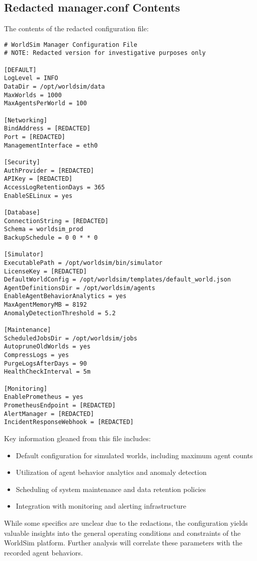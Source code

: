 \documentclass{article}
\begin{document}
\subsection{Redacted manager.conf Contents}
\label{apx:redactedconf}
The contents of the redacted configuration file:

\begin{verbatim}
# WorldSim Manager Configuration File
# NOTE: Redacted version for investigative purposes only

[DEFAULT]
LogLevel = INFO
DataDir = /opt/worldsim/data  
MaxWorlds = 1000
MaxAgentsPerWorld = 100

[Networking]  
BindAddress = [REDACTED]
Port = [REDACTED]
ManagementInterface = eth0

[Security]
AuthProvider = [REDACTED]  
APIKey = [REDACTED]
AccessLogRetentionDays = 365  
EnableSELinux = yes

[Database]
ConnectionString = [REDACTED]
Schema = worldsim_prod
BackupSchedule = 0 0 * * 0  

[Simulator]
ExecutablePath = /opt/worldsim/bin/simulator
LicenseKey = [REDACTED]
DefaultWorldConfig = /opt/worldsim/templates/default_world.json
AgentDefinitionsDir = /opt/worldsim/agents
EnableAgentBehaviorAnalytics = yes
MaxAgentMemoryMB = 8192  
AnomalyDetectionThreshold = 5.2

[Maintenance]  
ScheduledJobsDir = /opt/worldsim/jobs
AutopruneOldWorlds = yes
CompressLogs = yes
PurgeLogsAfterDays = 90  
HealthCheckInterval = 5m

[Monitoring]
EnablePrometheus = yes
PrometheusEndpoint = [REDACTED]  
AlertManager = [REDACTED]
IncidentResponseWebhook = [REDACTED]
\end{verbatim}

Key information gleaned from this file includes:

\begin{itemize}
    \item Default configuration for simulated worlds, including maximum agent counts
    \item Utilization of agent behavior analytics and anomaly detection
    \item Scheduling of system maintenance and data retention policies  
    \item Integration with monitoring and alerting infrastructure
\end{itemize}

While some specifics are unclear due to the redactions, the configuration yields valuable insights into the general operating conditions and constraints of the WorldSim platform. Further analysis will correlate these parameters with the recorded agent behaviors.
\end{document}

